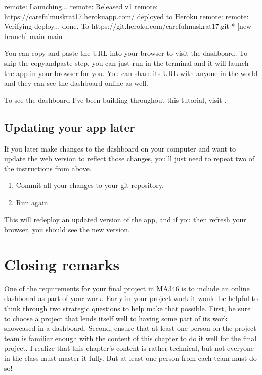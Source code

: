 \documentclass[letterpaper,10pt,english]{jupyterBook}
\begin{document}
\begin{sphinxVerbatim}[commandchars=\\\{\}]
remote: \PYGZhy{}\PYGZhy{}\PYGZhy{}\PYGZhy{}\PYGZhy{}\PYGZgt{} Launching...
remote:        Released v1
remote:        https://careful\PYGZhy{}muskrat\PYGZhy{}17.herokuapp.com/ deployed to Heroku
remote:
remote: Verifying deploy... done.
To https://git.heroku.com/careful\PYGZhy{}muskrat\PYGZhy{}17.git
 * [new branch]      main \PYGZhy{}\PYGZgt{} main
\end{sphinxVerbatim}

\sphinxAtStartPar
You can copy and paste the  URL into your browser to visit the dashboard.  To skip the copy\sphinxhyphen{}and\sphinxhyphen{}paste step, you can just run  in the terminal and it will launch the app in your browser for you.  You can share its URL with anyone in the world and they can see the dashboard online as well.

\sphinxAtStartPar
To see the dashboard I’ve been building throughout this tutorial, visit .


\subsection{Updating your app later}
\label{\detokenize{chapter-14-dashboards:updating-your-app-later}}
\sphinxAtStartPar
If you later make changes to the dashboard on your computer and want to update the web version to reflect those changes, you’ll just need to repeat two of the instructions from above.
\begin{enumerate}
%
\item {} 
\sphinxAtStartPar
Commit all your changes to your git repository.

\item {} 
\sphinxAtStartPar
Run  again.

\end{enumerate}

\sphinxAtStartPar
This will re\sphinxhyphen{}deploy an updated version of the app, and if you then refresh your browser, you should see the new version.


\section{Closing remarks}
\label{\detokenize{chapter-14-dashboards:closing-remarks}}
\sphinxAtStartPar
One of the requirements for your final project in MA346 is to include an online dashboard as part of your work.  Early in your project work it would be helpful to think through two strategic questions to help make that possible.  First, be sure to choose a project that lends itself well to having some part of its work showcased in a dashboard.  Second, ensure that at least one person on the project team is familiar enough with the content of this chapter to do it well for the final project.  I realize that this chapter’s content is rather technical, but not everyone in the class must master it fully.  But at least one person from each team must do so!
\end{document}
